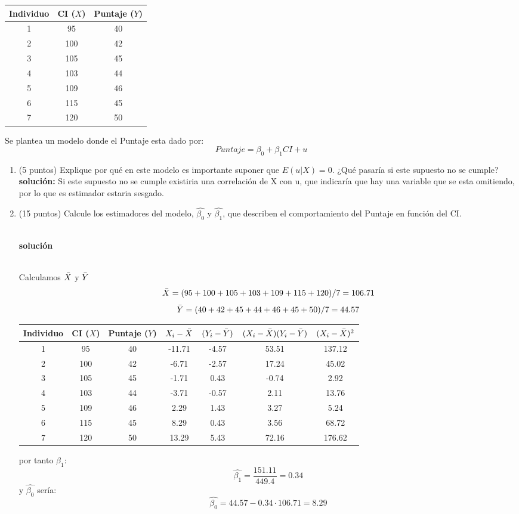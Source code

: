 \documentclass[10pt,a4paper]{article}
\begin{document}
\begin{enumerate}
\begin{center}
\begin{tabular}{|c|c|c|}
\hline
\textbf{Individuo} & \textbf{CI} ($X$) & \textbf{Puntaje} ($Y$)\\
\hline
1 & 95  & 40 \\
2 & 100 & 42 \\
3 & 105 & 45 \\
4 & 103 & 44 \\
5 & 109 & 46 \\
6 & 115 & 45 \\
7 & 120 & 50 \\
\hline
\end{tabular}
\end{center}

Se plantea un modelo donde el Puntaje esta dado por:
$$Puntaje = \beta_0 + \beta_1 CI + u$$

\begin{enumerate}
    \item (5 puntos) Explique por qué en este modelo es importante suponer que $E(u|X)=0$. ¿Qué pasaría si este supuesto no se cumple?
    \\
    \textbf{solución:}
    Si este supuesto no se cumple existiria una correlación de X con u, que indicaría que hay una variable que se esta omitiendo, por lo que es estimador estaria sesgado.

    \item (15 puntos) Calcule los estimadores del modelo, $\hat{\beta_0}$ y $\hat{\beta_1}$, que describen el comportamiento del Puntaje en función del CI.

\\

\textbf{solución}

\\

Calculamos $\Bar{X}$ y $\Bar{Y}$
$$\Bar{X} = (95+100+105+103+109+115+120)/7=106.71$$
$$\Bar{Y}=(40+42+45+44+46+45+50)/7=44.57$$
\begin{center}
\begin{tabular}{|c|c|c|c|c|c|c|}
\hline
\textbf{Individuo} & \textbf{CI} ($X$) & \textbf{Puntaje} ($Y$) & $X_i-\Bar{X}$ & $(Y_i - \Bar{Y})$ & $(X_i-\Bar{X})(Y_i-\Bar{Y})$ & $(X_i-\Bar{X})^2$\\
\hline
1 & 95  & 40 & -11.71& -4.57& 53.51& 137.12\\
2 & 100 & 42 & -6.71 & -2.57& 17.24& 45.02 \\
3 & 105 & 45 & -1.71 & 0.43 & -0.74& 2.92  \\
4 & 103 & 44 & -3.71 & -0.57& 2.11 & 13.76 \\
5 & 109 & 46 & 2.29  & 1.43 & 3.27 & 5.24  \\
6 & 115 & 45 & 8.29  & 0.43 & 3.56 & 68.72 \\
7 & 120 & 50 & 13.29 & 5.43 & 72.16& 176.62 \\
\hline
\end{tabular}
\end{center}
por tanto $\beta_1$:
$$\hat{\beta_1} = \frac{151.11}{449.4}=0.34$$
y $\hat{\beta_0}$ sería:
$$\hat{\beta_0}= 44.57-0.34\cdot 106.71 = 8.29$$


\end{enumerate}
\end{enumerate}
\end{document}
